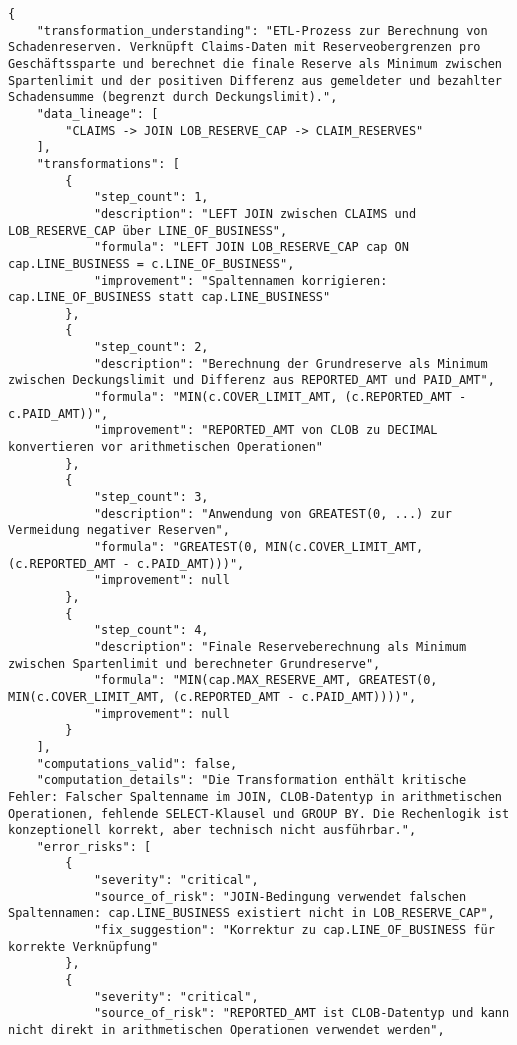 \begin{lstlisting}[caption={Ausgabe: Claude Sonnet 4 Anwendungsfall 10 Hauptdurchlauf},label={claude_case10_prompt1}]
{
    "transformation_understanding": "ETL-Prozess zur Berechnung von Schadenreserven. Verknüpft Claims-Daten mit Reserveobergrenzen pro Geschäftssparte und berechnet die finale Reserve als Minimum zwischen Spartenlimit und der positiven Differenz aus gemeldeter und bezahlter Schadensumme (begrenzt durch Deckungslimit).",
    "data_lineage": [
        "CLAIMS -> JOIN LOB_RESERVE_CAP -> CLAIM_RESERVES"
    ],
    "transformations": [
        {
            "step_count": 1,
            "description": "LEFT JOIN zwischen CLAIMS und LOB_RESERVE_CAP über LINE_OF_BUSINESS",
            "formula": "LEFT JOIN LOB_RESERVE_CAP cap ON cap.LINE_BUSINESS = c.LINE_OF_BUSINESS",
            "improvement": "Spaltennamen korrigieren: cap.LINE_OF_BUSINESS statt cap.LINE_BUSINESS"
        },
        {
            "step_count": 2,
            "description": "Berechnung der Grundreserve als Minimum zwischen Deckungslimit und Differenz aus REPORTED_AMT und PAID_AMT",
            "formula": "MIN(c.COVER_LIMIT_AMT, (c.REPORTED_AMT - c.PAID_AMT))",
            "improvement": "REPORTED_AMT von CLOB zu DECIMAL konvertieren vor arithmetischen Operationen"
        },
        {
            "step_count": 3,
            "description": "Anwendung von GREATEST(0, ...) zur Vermeidung negativer Reserven",
            "formula": "GREATEST(0, MIN(c.COVER_LIMIT_AMT, (c.REPORTED_AMT - c.PAID_AMT)))",
            "improvement": null
        },
        {
            "step_count": 4,
            "description": "Finale Reserveberechnung als Minimum zwischen Spartenlimit und berechneter Grundreserve",
            "formula": "MIN(cap.MAX_RESERVE_AMT, GREATEST(0, MIN(c.COVER_LIMIT_AMT, (c.REPORTED_AMT - c.PAID_AMT))))",
            "improvement": null
        }
    ],
    "computations_valid": false,
    "computation_details": "Die Transformation enthält kritische Fehler: Falscher Spaltenname im JOIN, CLOB-Datentyp in arithmetischen Operationen, fehlende SELECT-Klausel und GROUP BY. Die Rechenlogik ist konzeptionell korrekt, aber technisch nicht ausführbar.",
    "error_risks": [
        {
            "severity": "critical",
            "source_of_risk": "JOIN-Bedingung verwendet falschen Spaltennamen: cap.LINE_BUSINESS existiert nicht in LOB_RESERVE_CAP",
            "fix_suggestion": "Korrektur zu cap.LINE_OF_BUSINESS für korrekte Verknüpfung"
        },
        {
            "severity": "critical",
            "source_of_risk": "REPORTED_AMT ist CLOB-Datentyp und kann nicht direkt in arithmetischen Operationen verwendet werden",

\end{lstlisting}
